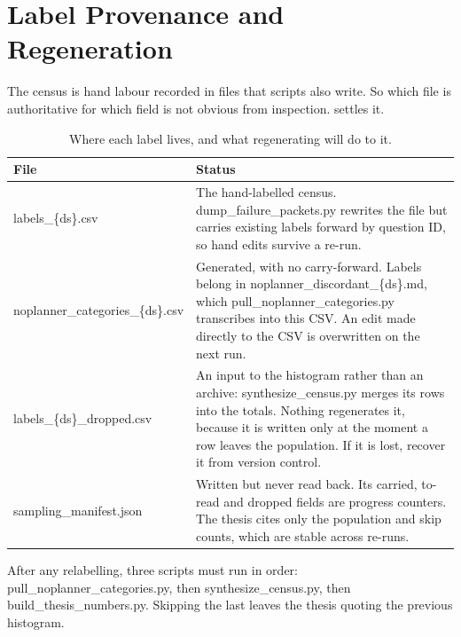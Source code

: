 \section{Label Provenance and Regeneration}\label{sec:census-corrections}

The census is hand labour recorded in files that scripts also write. So which
file is authoritative for which field is not obvious from inspection.
 settles it.

\begin{table}[!htb]
  \begin{center}
    \caption[Where each label lives]{Where each label lives, and what
    regenerating will do to it.}
    \label{tab:labelfiles}
    \footnotesize
    \begin{tabular}{|l|L{88mm}|}
      \hline
      \textbf{File} & \textbf{Status} \\
      \hline
      \textsf{labels\_\{ds\}.csv} &
      The hand-labelled census. \textsf{dump\_failure\_packets.py} rewrites the
      file but carries existing labels forward by question ID, so hand edits
      survive a re-run. \\
      \hline
      \textsf{noplanner\_categories\_\{ds\}.csv} &
      Generated, with no carry-forward. Labels belong in
      \textsf{noplanner\_discordant\_\{ds\}.md}, which
      \textsf{pull\_noplanner\_categories.py} transcribes into this CSV. An edit
      made directly to the CSV is overwritten on the next run. \\
      \hline
      \textsf{labels\_\{ds\}\_dropped.csv} &
      An input to the histogram rather than an archive:
      \textsf{synthesize\_census.py} merges its rows into the totals. Nothing
      regenerates it, because it is written only at the moment a row leaves the
      population. If it is lost, recover it from version control. \\
      \hline
      \textsf{sampling\_manifest.json} &
      Written but never read back. Its carried, to-read and dropped fields are
      progress counters. The thesis cites only the population and skip counts,
      which are stable across re-runs. \\
      \hline
    \end{tabular}
  \end{center}
\end{table}

After any relabelling, three scripts must run in order:
\textsf{pull\_noplanner\_categories.py}, then \textsf{synthesize\_census.py},
then \textsf{build\_thesis\_numbers.py}. Skipping the last leaves the thesis
quoting the previous histogram.

